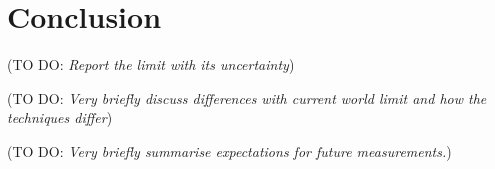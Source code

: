 \documentclass[12pt]{article}
\newcommand{\todo }[1]{({\color{red}\sc TO DO: \textit{#1}})}
\begin{document}




%
%

%

\section{Conclusion}
\todo{Report the limit with its uncertainty}

\todo{Very briefly discuss differences with current world limit and how the techniques differ}

\todo{Very briefly summarise expectations for future measurements.}



\end{document}
